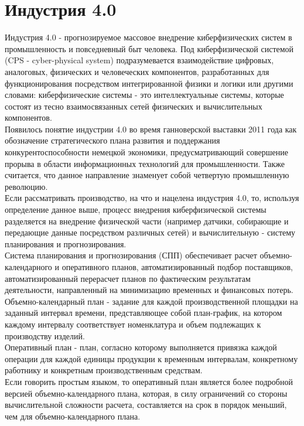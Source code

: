 \section{Индустрия 4.0}
Индустрия 4.0 - прогнозируемое массовое внедрение киберфизических систем в промышленность и повседневный быт человека.
Под киберфизической системой (CPS - cyber-physical system) подразумевается взаимодействие цифровых, аналоговых, физических и человеческих компонентов, разработанных для функционирования посредством интегрированной физики и логики или другими словами: киберфизические системы - это интеллектуальные системы, которые состоят из тесно взаимосвязанных сетей физических и вычислительных компонентов.\cite{nist}\\
\indent Появилось понятие индустрии 4.0 во время ганноверской выставки 2011 года как обозначение стратегического плана развития и поддержания конкурентоспособности немецкой экономики, предусматривающий совершение прорыва в области информационных технологий для промышленности.
Также считается, что данное направление знаменует собой четвертую промышленную революцию.\cite{industry}\\
\indent Если рассматривать производство, на что и нацелена индустрия 4.0, то, используя определение данное выше, процесс внедрения киберфизической системы разделяется на внедрение физической части (например датчики, собирающие и передающие данные посредством различных сетей) и вычислительную - систему планирования и прогнозирования.\\
\indent Система планирования и прогнозирования (СПП) обеспечивает расчет объемно-календарного и оперативного планов, автоматизированный подбор поставщиков, автоматизированный перерасчет планов по фактическим результатам деятельности, направленный на минимизацию временных и финансовых потерь.\\
\indent Объемно-календарный план - задание для каждой производственной площадки на заданный интервал времени, представляющее собой план-график, на котором каждому интервалу соответствует номенклатура и объем подлежащих к производству изделий.\cite{niokr}\\
\indent Оперативный план - план, согласно которому выполняется привязка каждой операции для каждой единицы продукции к временным интервалам, конкретному работнику и конкретным производственным средствам.\cite{niokr}\\
\indent Если говорить простым языком, то оперативный план является более подробной версией объемно-календарного плана, которая, в силу ограничений со стороны вычислительной сложности расчета, составляется на срок в порядок меньший, чем для объемно-календарного плана.
